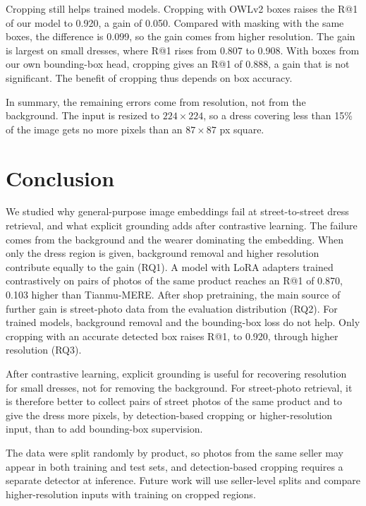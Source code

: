 \documentclass[sigconf,nonacm]{acmart}
\begin{document}
Cropping still helps trained models. Cropping with OWLv2 boxes raises the R@1 of our model to 0.920, a gain of 0.050. Compared with masking with the same boxes, the difference is 0.099, so the gain comes from higher resolution. The gain is largest on small dresses, where R@1 rises from 0.807 to 0.908. With boxes from our own bounding-box head, cropping gives an R@1 of 0.888, a gain that is not significant. The benefit of cropping thus depends on box accuracy.

In summary, the remaining errors come from resolution, not from the background. The input is resized to $224\times224$, so a dress covering less than 15\% of the image gets no more pixels than an $87\times87$ px square.

\section{Conclusion}

We studied why general-purpose image embeddings fail at street-to-street dress retrieval, and what explicit grounding adds after contrastive learning. The failure comes from the background and the wearer dominating the embedding. When only the dress region is given, background removal and higher resolution contribute equally to the gain (RQ1). A model with LoRA adapters trained contrastively on pairs of photos of the same product reaches an R@1 of 0.870, 0.103 higher than Tianmu-MERE. After shop pretraining, the main source of further gain is street-photo data from the evaluation distribution (RQ2). For trained models, background removal and the bounding-box loss do not help. Only cropping with an accurate detected box raises R@1, to 0.920, through higher resolution (RQ3).

After contrastive learning, explicit grounding is useful for recovering resolution for small dresses, not for removing the background. For street-photo retrieval, it is therefore better to collect pairs of street photos of the same product and to give the dress more pixels, by detection-based cropping or higher-resolution input, than to add bounding-box supervision.

The data were split randomly by product, so photos from the same seller may appear in both training and test sets, and detection-based cropping requires a separate detector at inference. Future work will use seller-level splits and compare higher-resolution inputs with training on cropped regions.
\end{document}
